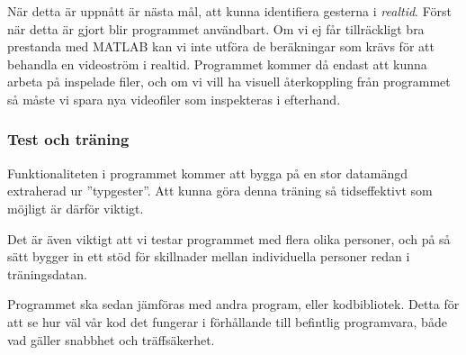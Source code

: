 \documentclass[../rapport_MVEX01-11-05]{subfiles}
\begin{document}
När detta är uppnått är nästa mål, att
kunna identifiera gesterna i \emph{realtid}. Först när detta är gjort blir
programmet användbart.
Om vi ej får tillräckligt bra prestanda med MATLAB kan vi inte utföra de
beräkningar som krävs för att behandla en videoström i realtid. Programmet
kommer då endast att kunna arbeta på inspelade filer, och om vi vill ha
visuell återkoppling från programmet så måste vi spara nya videofiler som
inspekteras i efterhand.

\subsubsection{Test och träning}

Funktionaliteten i programmet kommer att bygga på en stor datamängd extraherad
ur ''typgester''. Att kunna göra denna träning så tidseffektivt som möjligt är 
därför viktigt.

Det är även viktigt att vi testar programmet med flera olika personer,
och på så sätt bygger in ett stöd för skillnader mellan individuella
personer redan i träningsdatan.

Programmet ska sedan jämföras med andra program, eller kodbibliotek. Detta för
att se hur väl vår kod det fungerar i förhållande till befintlig programvara,
både vad gäller snabbhet och träffsäkerhet.
\end{document}
